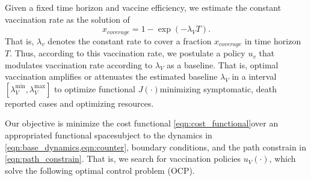     Given a fixed time horizon and vaccine efficiency,
we estimate the constant vaccination rate as the solution of
\begin{equation}
    x_{coverage} = 1 - \exp(-\lambda_V T).
\end{equation}
    That is, $\lambda_v$ denotes the constant rate
to cover  a fraction $x_{coverage}$ in time horizon $T$.
Thus, according to this vaccination rate, we postulate a policy $u_v$ that
modulates vaccination rate according to $\lambda_V$ as a baseline. That is,
optimal vaccination amplifies or attenuates the estimated baseline
$\lambda_V$ in a interval $[\lambda_V ^ {\min}, \lambda_V ^ {\max}]$
to optimize functional $J(\cdot)$\textemdash minimizing
symptomatic, death reported cases and optimizing resources.

    Our objective is minimize the cost functional
\eqref{eqn:cost_functional}\textemdash over an appropriated functional
space\textemdash subject to the dynamics in
\cref{eqn:base_dynamics,eqn:counter}, boundary conditions, and the path
constrain in \eqref{eqn:path_constrain}.
That is, we search for vaccination policies $u_V(\cdot)$, which
solve the following optimal control problem (OCP).
